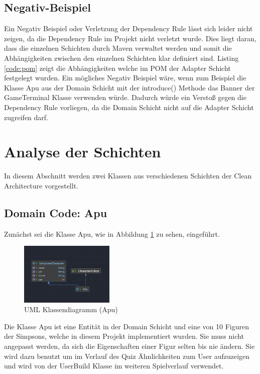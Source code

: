 \subsection{Negativ-Beispiel}
Ein Negativ Beispiel oder Verletzung der Dependency Rule lässt sich leider nicht zeigen, da die Dependency Rule im Projekt nicht verletzt wurde. Dies liegt daran, dass die einzelnen Schichten durch Maven verwaltet werden und somit die Abhängigkeiten zwischen den einzelnen Schichten klar definiert sind. Listing \ref{code:pom} zeigt die Abhängigkeiten welche im \ac{POM} der Adapter Schicht festgelegt wurden.\newline
Ein mögliches Negativ Beispiel wäre, wenn zum Beispiel die Klasse Apu aus der Domain Schicht mit der introduce() Methode das Banner der GameTerminal Klasse verwenden würde. Dadurch würde ein Verstoß gegen die Dependency Rule vorliegen, da die Domain Schicht nicht auf die Adapter Schicht zugreifen darf. 


\newpage
\section{Analyse der Schichten}
In diesem Abschnitt werden zwei Klassen aus verschiedenen Schichten der Clean Architecture vorgestellt. 
\subsection{Domain Code: Apu}
Zunächst sei die Klasse Apu, wie in Abbildung \ref{fig:Apu} zu sehen, eingeführt.
\begin{figure}[ht]
    \centering
    \includegraphics[width=0.4\textwidth]{Bilder/Apu.png}
    \caption{UML Klassendiagramm (Apu)}
    \label{fig:Apu}
\end{figure}
Die Klasse Apu ist eine Entität in der Domain Schicht und eine von 10 Figuren der Simpsons, welche in diesem Projekt implementiert wurden. Sie muss nicht angepasst werden, da sich die Eigenschaften einer Figur selten bis nie ändern. Sie wird dazu benutzt um im Verlauf des Quiz Ähnlichkeiten zum User aufzuzeigen und wird von der UserBuild Klasse im weiteren Spielverlauf verwendet.
\newpage
